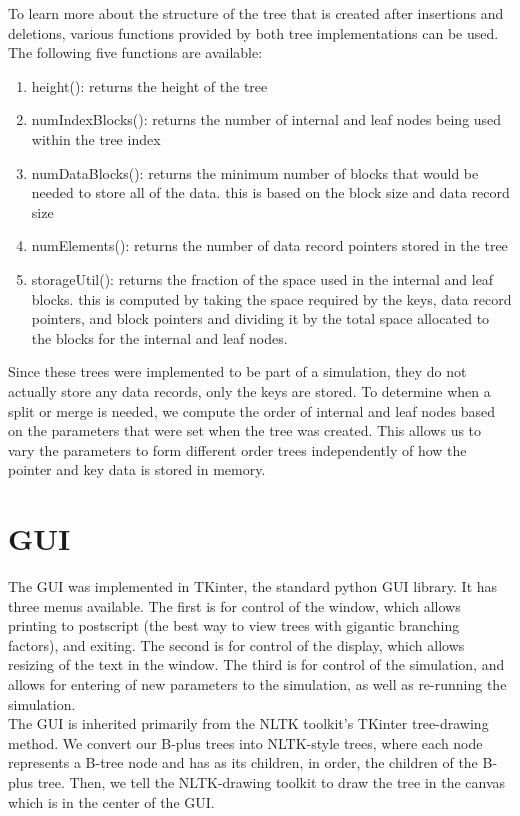 \documentclass[fleqn]{article}
\begin{document}
To learn more about the structure of the tree that is created after insertions and deletions, various functions provided by both tree implementations can be used.  The following five functions are available:
\begin{enumerate}
\item
height():  returns the height of the tree
\item
numIndexBlocks(): returns the number of internal and leaf nodes being used within the tree index
\item
numDataBlocks(): returns the minimum number of blocks that would be needed to store all of the data.  this is based on the block size and data record size
\item
numElements(): returns the number of data record pointers stored in the tree
\item
storageUtil(): returns the fraction of the space used in the internal and leaf blocks.  this is computed by taking the space required by the keys, data record pointers, and block pointers and dividing it by the total space allocated to the blocks for the internal and leaf nodes.
\end{enumerate}
Since these trees were implemented to be part of a simulation, they do not actually store any data records, only the keys are stored.  To determine when a split or merge is needed, we compute the order of internal and leaf nodes based on the parameters that were set when the tree was created.  This allows us to vary the parameters to form different order trees independently of how the pointer and key data is stored in memory.

\section{GUI}

The GUI was implemented in TKinter, the standard python GUI library.  It has three menus available.  The first is for control of the window, which allows printing to postscript (the best way to view trees with gigantic branching factors), and exiting.  The second is for control of the display, which allows resizing of the text in the window.  The third is for control of the simulation, and allows for entering of new parameters to the simulation, as well as re-running the simulation.\\

The GUI is inherited primarily from the NLTK toolkit's TKinter tree-drawing method.  We convert our B-plus trees into NLTK-style trees, where each node represents a B-tree node and has as its children, in order, the children of the B-plus tree.  Then, we tell the NLTK-drawing toolkit to draw the tree in the canvas which is in the center of the GUI.
\end{document}
